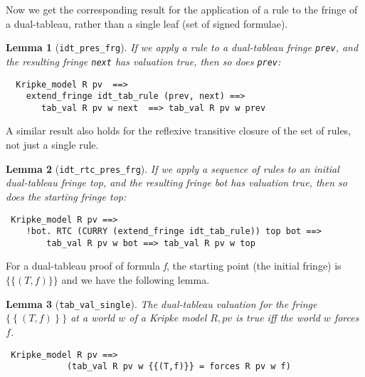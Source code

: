 \documentclass[a4paper]{article}
\newtheorem{lemma}{Lemma}
\begin{document}
Now we get the corresponding result for the application of a rule to 
the fringe of a dual-tableau, rather than a single leaf (set of signed formulae).
\begin{lemma}[\texttt{idt\_pres\_frg}] \label{idt-pres-frg} If we
  apply a rule to a dual-tableau fringe \texttt{prev}, and the
  resulting fringe \texttt{next} has valuation true, then so does 
\texttt{prev}:
\end{lemma}
\begin{verbatim}
  Kripke_model R pv  ==> 
    extend_fringe idt_tab_rule (prev, next) ==> 
       tab_val R pv w next  ==> tab_val R pv w prev
\end{verbatim}

A similar result also holds for the 
reflexive transitive closure of the set of rules, not just a single rule.
\begin{lemma}[\texttt{idt\_rtc\_pres\_frg}] \label{idt-rtc-pres-frg}
  If we apply a sequence of rules to an initial dual-tableau fringe
  \textit{top}, and the resulting fringe \textit{bot} has
  valuation true, then so does the starting fringe \textit{top}:
\end{lemma}
\begin{verbatim}
 Kripke_model R pv ==>
    !bot. RTC (CURRY (extend_fringe idt_tab_rule)) top bot ==> 
        tab_val R pv w bot ==> tab_val R pv w top
\end{verbatim}

For a dual-tableau proof of formula \textit{f},
the starting point (the initial fringe) is $\{\{(T,f)\}\}$ and 
we have the following lemma.
\begin{lemma}[\texttt{tab\_val\_single}] \label{tab-val-single}
%
The dual-tableau valuation for the fringe $\{ ~\{~ (T, f)~ \}~ \}$ at
a world $w$ of a Kripke model $R, pv$ is
true iff the world $w$ forces $f$.
\end{lemma}
\begin{verbatim}
 Kripke_model R pv ==> 
            (tab_val R pv w {{(T,f)}} = forces R pv w f)
\end{verbatim}
\end{document}
